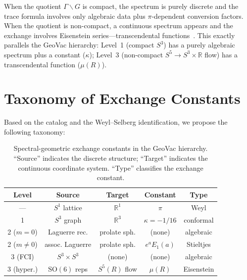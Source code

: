 \documentclass[aps,pra,twocolumn,superscriptaddress,longbibliography]{revtex4-2}
\begin{document}
When the quotient $\Gamma \backslash G$ is compact, the spectrum
is purely discrete and the trace formula involves only algebraic
data plus $\pi$-dependent conversion factors.  When the quotient
is non-compact, a continuous spectrum appears and the exchange
involves Eisenstein series---transcendental
functions~\cite{selberg1956}.  This exactly parallels the
GeoVac hierarchy: Level~1 (compact $S^3$) has a purely algebraic
spectrum plus a constant ($\kappa$); Level~3 (non-compact
$S^5 \to S^3 \times \mathbb{R}$ flow) has a transcendental
function ($\mu(R)$).



\section{Taxonomy of Exchange Constants}
\label{sec:taxonomy}

Based on the catalog and the Weyl--Selberg identification, we
propose the following taxonomy:

\begin{table}[h]
\caption{Spectral-geometric exchange constants in the GeoVac
  hierarchy.  ``Source'' indicates the discrete structure;
  ``Target'' indicates the continuous coordinate system.
  ``Type'' classifies the exchange constant.}
\label{tab:taxonomy}
\begin{ruledtabular}
\begin{tabular}{ccccc}
  Level & Source & Target & Constant & Type \\
  \hline
  --- & $S^1$ lattice & $\mathbb{R}^1$ & $\pi$ & Weyl \\
  1 & $S^3$ graph & $\mathbb{R}^3$ & $\kappa = -1/16$ & conformal \\
  2 ($m{=}0$) & Laguerre rec. & prolate sph. & (none) & algebraic \\
  2 ($m{\neq}0$) & assoc. Laguerre & prolate sph. & $e^a E_1(a)$
    & Stieltjes \\
  3 (FCI) & $S^3 {\times} S^3$ & (none) & (none) & algebraic \\
  3 (hyper.) & $\mathrm{SO}(6)$ reps & $S^5(R)$ flow
    & $\mu(R)$ & Eisenstein \\
\end{tabular}
\end{ruledtabular}
\end{table}
\end{document}
